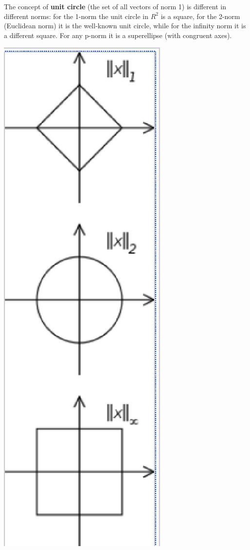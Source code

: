 The concept of \textbf{unit circle} (the set of all vectors of norm 1) is different in different norms: for the 1-norm the unit circle in $R^2$ is a square, for the 2-norm (Euclidean norm) it is the well-known unit circle, while for the infinity norm it is a different square. For any p-norm it is a superellipse (with congruent axes).\par
\includegraphics[scale=0.5]{fig/exp_norm_unit_circle.eps}

